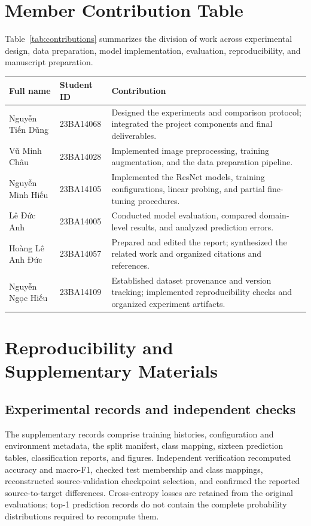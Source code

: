 \documentclass[10pt,a4paper]{article}
\begin{document}
\clearpage
\appendix
\section{Member Contribution Table}
Table~\ref{tab:contributions} summarizes the division of work across experimental design, data preparation, model implementation, evaluation, reproducibility, and manuscript preparation.

\begin{center}
\begingroup
\renewcommand{\arraystretch}{1.2}
\begin{tabularx}{\linewidth}{p{4.1cm}p{2.1cm}X}
\toprule
Full name & Student ID & Contribution\\
\midrule
Nguyễn Tiến Dũng &23BA14068&Designed the experiments and comparison protocol; integrated the project components and final deliverables.\\
Vũ Minh Châu &23BA14028&Implemented image preprocessing, training augmentation, and the data preparation pipeline.\\
Nguyễn Minh Hiếu &23BA14105&Implemented the ResNet models, training configurations, linear probing, and partial fine-tuning procedures.\\
Lê Đức Anh &23BA14005&Conducted model evaluation, compared domain-level results, and analyzed prediction errors.\\
Hoàng Lê Anh Đức &23BA14057&Prepared and edited the report; synthesized the related work and organized citations and references.\\
Nguyễn Ngọc Hiếu &23BA14109&Established dataset provenance and version tracking; implemented reproducibility checks and organized experiment artifacts.\\
\bottomrule
\end{tabularx}
\endgroup
{}\label{tab:contributions}
\end{center}

\section{Reproducibility and Supplementary Materials}
\subsection{Experimental records and independent checks}
The supplementary records comprise training histories, configuration and environment metadata, the split manifest, class mapping, sixteen prediction tables, classification reports, and figures. Independent verification recomputed accuracy and macro-F1, checked test membership and class mappings, reconstructed source-validation checkpoint selection, and confirmed the reported source-to-target differences. Cross-entropy losses are retained from the original evaluations; top-1 prediction records do not contain the complete probability distributions required to recompute them.
\end{document}
